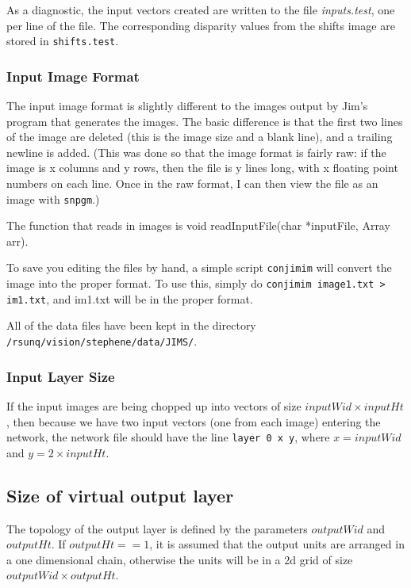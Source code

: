 \documentclass[a4paper]{article}
\begin{document}
As a diagnostic, the input vectors created are written to the file
\textit{inputs.test}, one per line of the file.  The corresponding
disparity values from the shifts image are stored in
\texttt{shifts.test}.

\subsubsection{Input Image Format}

The input image format is slightly different to the images output by
Jim's program that generates the images.  The basic difference is that
the first two lines of the image are deleted (this is the image size
and a blank line), and a trailing newline is added.    (This was done
so that the image format is fairly raw: if the image is x columns and y
rows, then the file is y lines long, with x floating point numbers on
each line.  Once in the raw format, I can then view the file as an
image with \texttt{snpgm}.)

The function that reads in images is void readInputFile(char
*inputFile, Array arr).

To save you editing the files by hand, a simple script
\texttt{conjimim} will convert the image into the proper format.  To
use this, simply do \texttt{conjimim image1.txt > im1.txt}, and
im1.txt will be in the proper format.

All of the data files have been kept in the directory
\texttt{/rsunq/vision/stephene/data/JIMS/}.

\subsubsection{Input Layer Size}

If the input images are being chopped up into vectors of size
$inputWid \times inputHt$, then because we have two input vectors (one from
each image) entering the network, the network file should have the line
\texttt{layer 0 x y}, where $x= inputWid$ and $y = 2 \times inputHt$.

\subsection{Size of virtual output layer}

The topology of the output layer is defined by the parameters
$outputWid$ and $outputHt$.  If $outputHt==1$, it is assumed that the
output units are arranged in a one dimensional chain, otherwise the
units will be in a 2d grid of size $outputWid \times outputHt$.
\end{document}
